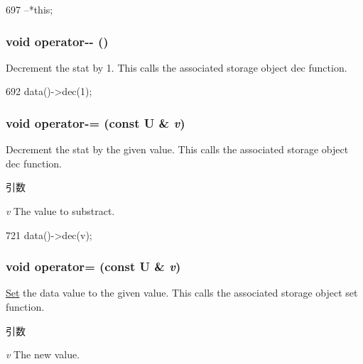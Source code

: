 \begin{DoxyCode}
697 { --*this; }
\end{DoxyCode}
\hypertarget{classStats_1_1ScalarBase_a59f5b5b0d341cf7bd8d23f8f9f96edce}{
\subsubsection[{operator-\/-\/}]{\setlength{\rightskip}{0pt plus 5cm}void operator-\/-\/ ()}}
\label{classStats_1_1ScalarBase_a59f5b5b0d341cf7bd8d23f8f9f96edce}
Decrement the stat by 1. This calls the associated storage object dec function. 


\begin{DoxyCode}
692 { data()->dec(1); }
\end{DoxyCode}
\hypertarget{classStats_1_1ScalarBase_a7f5bf4b1be35c726f936b48640ee3b4b}{
\subsubsection[{operator-\/=}]{\setlength{\rightskip}{0pt plus 5cm}void operator-\/= (const U \& {\em v})}}
\label{classStats_1_1ScalarBase_a7f5bf4b1be35c726f936b48640ee3b4b}
Decrement the stat by the given value. This calls the associated storage object dec function. 
\begin{DoxyParams}{引数}
\item[{\em v}]The value to substract. \end{DoxyParams}



\begin{DoxyCode}
721 { data()->dec(v); }
\end{DoxyCode}
\hypertarget{classStats_1_1ScalarBase_a0f6b0032b20a50bedaf20aab2f87f09d}{
\subsubsection[{operator=}]{\setlength{\rightskip}{0pt plus 5cm}void operator= (const U \& {\em v})}}
\label{classStats_1_1ScalarBase_a0f6b0032b20a50bedaf20aab2f87f09d}
\hyperlink{classSet}{Set} the data value to the given value. This calls the associated storage object set function. 
\begin{DoxyParams}{引数}
\item[{\em v}]The new value. \end{DoxyParams}



